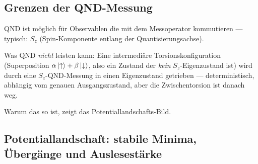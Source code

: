 \subsection{Grenzen der QND-Messung}

QND ist möglich für Observablen die mit dem
Messoperator kommutieren --- typisch: $S_z$ (Spin-Komponente
entlang der Quantisierungsachse).

Was QND \emph{nicht} leisten kann:
Eine intermediäre Torsionskonfiguration
(Superposition $\alpha\left|\uparrow\right\rangle + \beta\left|\downarrow\right\rangle$,
also ein Zustand der \emph{kein} $S_z$-Eigenzustand ist)
wird durch eine $S_z$-QND-Messung in einen Eigenzustand
getrieben --- deterministisch, abhängig vom genauen
Ausgangszustand, aber die Zwischentorsion ist danach weg.

Warum das so ist, zeigt das Potentiallandschafts-Bild.

\subsection{Potentiallandschaft: stabile Minima, Übergänge und Auslesestärke}
\label{sec:potential}


